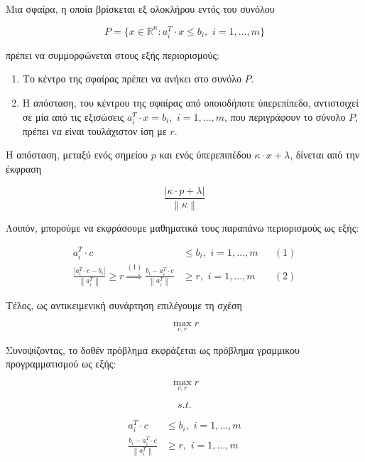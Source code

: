 \documentclass[12pt]{article}
\newcommand{\R}{\mathbb{R}}
\newcommand{\margin}{\hspace{4pt}}
\newcommand{\norm}[1]{\left\lVert#1\right\rVert}
\newcommand{\abs}[1]{\left\lvert#1\right\rvert}
\begin{document}
Μια σφαίρα, η οποία βρίσκεται εξ ολοκλήρου εντός του συνόλου

\[ P = \{x \in \R^n : a^{T}_{i} \cdot x \leq b_i, \margin i = 1, \dotsc, m\} \]

πρέπει να συμμορφώνεται στους εξής περιορισμούς:

\begin{enumerate}
    \item Το κέντρο της σφαίρας πρέπει να ανήκει στο συνόλο \( P \).
    \item Η απόσταση, του κέντρου της σφαίρας από οποιοδήποτε ύπερεπίπεδο, αντιστοιχεί σε μία
    από τις εξισώσεις \( a^{T}_{i} \cdot x = b_i, \margin i = 1, \dotsc, m\),
    που περιγράφουν το σύνολο \( P \), πρέπει να είναι τουλάχιστον ίση με \( r \).
\end{enumerate}

Η απόσταση, μεταξύ ενός σημείου \( p \) και ενός ύπερεπιπέδου \( κ \cdot x + λ \),
δίνεται από την έκφραση

\[ \frac{\abs{κ \cdot p + λ}}{\norm{κ}} \]

Λοιπόν, μπορούμε να εκφράσουμε μαθηματικά τους παραπάνω περιορισμούς ως εξής:

\begin{align*}
    a^{T}_{i} \cdot c & \leq b_i, \margin i = 1, \dotsc, m && (1)\\
    \frac{\abs{a^{T}_{i} \cdot c - b_i}}{\norm{a^{T}_{i}}} \geq r
    \stackrel{(1)}{\Rightarrow}\frac{b_i - a^{T}_{i} \cdot c}{\norm{a^{T}_{i}}} & \geq r, \margin i = 1, \dotsc, m&& (2)
\end{align*}

Τέλος, ως αντικειμενική συνάρτηση επιλέγουμε τη σχέση

\[ \max_{c, r} r \]

Συνοψίζοντας, το δοθέν πρόβλημα εκφράζεται ως πρόβλημα γραμμικου προγραμματισμού ως εξής:

\[ \max_{c, r} r \]

\[ s.t. \]

\begin{align*}
    a^{T}_{i} \cdot c & \leq b_i, \margin i = 1, \dotsc, m \\
    \frac{b_i - a^{T}_{i} \cdot c}{\norm{a^{T}_{i}}} & \geq r, \margin i = 1, \dotsc, m
\end{align*}

\pagebreak
\end{document}
